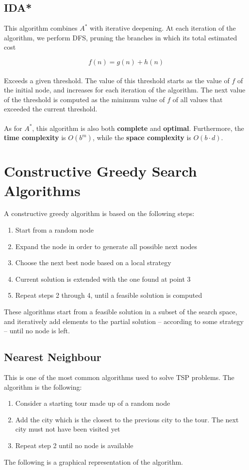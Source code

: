 \documentclass{article}
\begin{document}
\subsection{IDA*}
This algorithm combines $A^*$ with iterative deepening. At each iteration of the algorithm, we perform DFS, pruning the branches in which its total estimated cost

\[ f(n) = g(n) + h(n) \] \\
Exceeds a given threshold. The value of this threshold starts as the value of $f$ of the initial node, and increases for each iteration of the algorithm. The next value of the threshold is computed as the minimum value of $f$ of all values that exceeded the current threshold. \\ \\
As for $A^*$, this algorithm is also both \textbf{complete} and \textbf{optimal}. Furthermore, the \textbf{time complexity} is $O(b^m)$, while the \textbf{space complexity} is $O(b \cdot d)$.

\section{Constructive Greedy Search Algorithms}
A constructive greedy algorithm is based on the following steps:

\begin{enumerate}
	\item Start from a random node
	\item Expand the node in order to generate all possible next nodes
	\item Choose the next best node based on a local strategy
	\item Current solution is extended with the one found at point 3
	\item Repeat steps 2 through 4, until a feasible solution is computed
\end{enumerate}
These algorithms start from a feasible solution in a subset of the search space, and iteratively add elements to the partial solution -- according to some strategy -- until no node is left.

\subsection{Nearest Neighbour}
This is one of the most common algorithms used to solve TSP problems. The algorithm is the following:

\begin{enumerate}
	\item Consider a starting tour made up of a random node
	\item Add the city which is the closest to the previous city to the tour. The next city must not have been visited yet
	\item Repeat step 2 until no node is available
\end{enumerate}
The following is a graphical representation of the algorithm.\\
\end{document}
